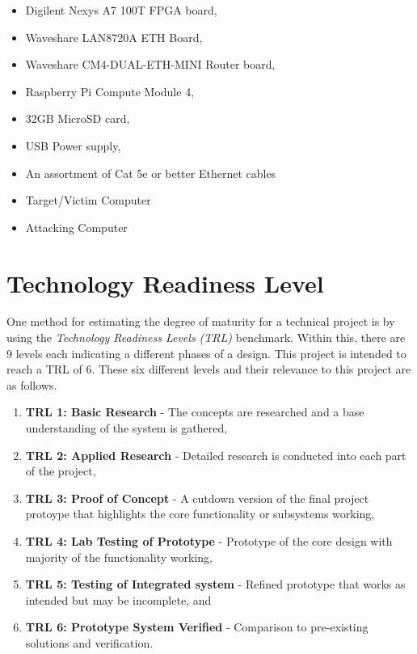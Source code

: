 \begin{itemize}
    \item Digilent Nexys A7 100T FPGA board,
    \item Waveshare LAN8720A ETH Board,
    \item Waveshare CM4-DUAL-ETH-MINI Router board,
    \item Raspberry Pi Compute Module 4,
    \item 32GB MicroSD card,
    \item USB Power supply,
    \item An assortment of Cat 5e or better Ethernet cables
    \item Target/Victim Computer
    \item Attacking Computer
\end{itemize}


\section{Technology Readiness Level}

One method for estimating the degree of maturity for a technical project is by using the \textit{Technology Readiness Levels (TRL)} benchmark. Within this, 
there are 9 levels each indicating a different phases of a design. This project is intended to reach a TRL of 6. These six different levels and their 
relevance to this project are as follows. 

\begin{enumerate}
    \item \textbf{TRL 1: Basic Research} - The concepts are researched and a base understanding of the system is gathered,
    \item \textbf{TRL 2: Applied Research} - Detailed research is conducted into each part of the project,
    \item \textbf{TRL 3: Proof of Concept} - A cutdown version of the final project protoype that highlights the core functionality or subsystems working,
    \item \textbf{TRL 4: Lab Testing of Prototype} - Prototype of the core design with majority of the functionality working,
    \item \textbf{TRL 5: Testing of Integrated system} - Refined prototype that works as intended but may be incomplete, and
    \item \textbf{TRL 6: Prototype System Verified} - Comparison to pre-existing solutions and verification. 
\end{enumerate}


